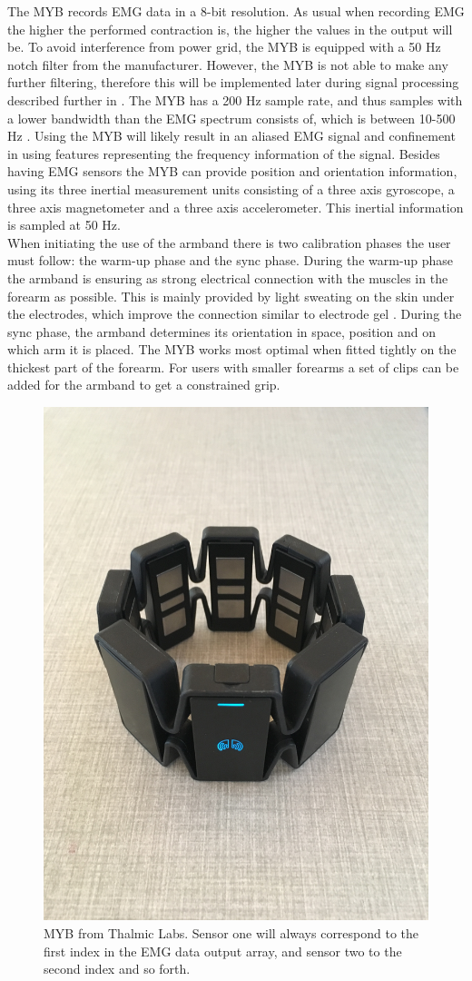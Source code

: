 The MYB records EMG data in a 8-bit resolution. As usual when recording EMG the higher the performed contraction is, the higher the values in the output will be. To avoid interference from power grid, the MYB is equipped with a 50 Hz notch filter from the manufacturer. However, the MYB is not able to make any further filtering, therefore this will be implemented later during signal processing described further in . The MYB has a 200 Hz sample rate, and thus samples with a lower bandwidth than the EMG spectrum consists of, which is between 10-500 Hz \cite{Cram2012}. Using the MYB will likely result in an aliased EMG signal and confinement in using features representing the frequency information of the signal.
Besides having EMG sensors the MYB can provide position and orientation information, using its three inertial measurement units consisting of a three axis gyroscope, a three axis magnetometer and a three axis accelerometer. This inertial information is sampled at 50 Hz. \cite{Myoarmband2013} \\
When initiating the use of the armband there is two calibration phases the user must follow: the warm-up phase and the sync phase. During the warm-up phase the armband is ensuring as strong electrical connection with the muscles in the forearm as possible. This is mainly provided by light sweating on the skin under the electrodes, which improve the connection similar to electrode gel \cite{Cram2012}. During the sync phase, the armband determines its orientation in space, position and on which arm it is placed. The MYB works most optimal when fitted tightly on the thickest part of the forearm. For users with smaller forearms a set of clips can be added for the armband to get a constrained grip. \cite{Myoarmband2013}

\begin{figure}[H]                 
	\includegraphics[width=.4\textwidth]{figures/xBackground/myoband}  
	\caption{MYB from Thalmic Labs. Sensor one will always correspond to the first index in the EMG data output array, and sensor two to the second index and so forth.}
	\label{fig:myoarmband} 
\end{figure}

